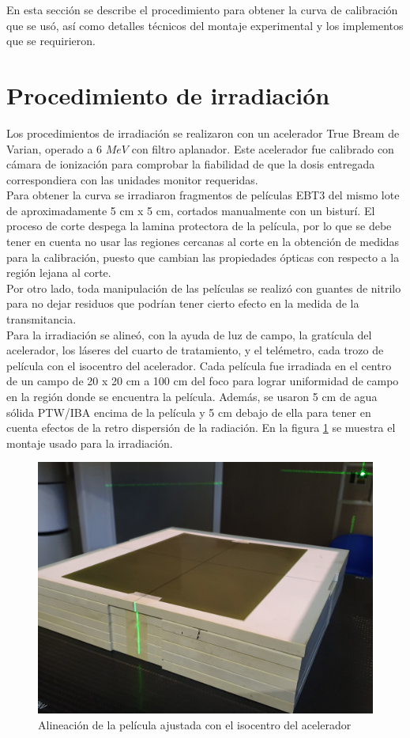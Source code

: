 En esta sección se describe el procedimiento para obtener la curva de calibración que se usó, así como detalles técnicos del montaje experimental y los implementos que se requirieron. 
\section{Procedimiento de irradiación}
Los procedimientos de irradiación se realizaron con un acelerador True Bream de  Varian, operado a 6 $ MeV$ con filtro aplanador. Este acelerador fue calibrado con cámara de ionización para comprobar la fiabilidad de que la dosis entregada correspondiera con las unidades monitor requeridas.\\

Para obtener la curva se irradiaron fragmentos de películas EBT3 del mismo lote de aproximadamente 5 cm x 5 cm, cortados manualmente con un bisturí. El proceso de corte despega la lamina protectora de la película, por lo que se debe tener en cuenta no usar las regiones cercanas al corte en la obtención de medidas para la calibración, puesto que cambian las propiedades ópticas con respecto a la región lejana al corte. \\

Por otro lado, toda manipulación de las películas se realizó con guantes de nitrilo para no dejar residuos que podrían tener cierto efecto en la medida de la transmitancia. \\

Para la irradiación se alineó, con la ayuda de luz de campo, la gratícula del acelerador, los láseres del cuarto de tratamiento, y el telémetro, cada trozo de película con el isocentro del acelerador. Cada película fue irradiada en el centro de un campo de 20 x 20 cm a 100 cm del foco para lograr uniformidad de campo en la región donde se encuentra la película. Además, se usaron 5 cm de agua sólida PTW/IBA encima de la película y 5 cm debajo de ella para tener en cuenta efectos de la retro dispersión de la radiación. En la figura  \ref{fig:MontajePelicula} se muestra el montaje usado para la irradiación.\\
\begin{figure}
	\centering
	\includegraphics[width=0.5\linewidth]{images/alineacionCampo.jpg}
	\caption{Alineación de la película ajustada con el isocentro del acelerador}
	\label{fig:MontajePelicula}
\end{figure}

